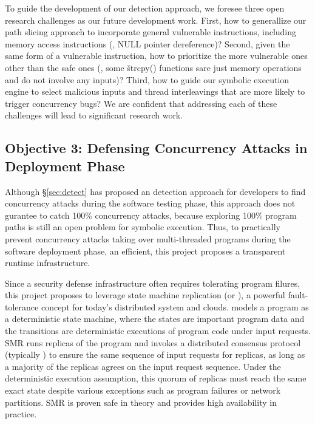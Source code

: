  To guide the development of our detection 
approach, we foresee three open research challenges as our future development 
work. First, how to generallize our path slicing approach to incorporate general 
vulnerable instructions, including memory access instructions (\eg, NULL pointer 
dereference)? Second, given the same form of a vulnerable instruction, how to 
prioritize the more vulnerable ones other than the safe ones (\eg, some 
\v{strcpy()} functions sare just memory operations and do not involve any 
inputs)? Third, how to guide our symbolic execution engine to select malicious 
inputs and thread interleavings that are more likely to trigger concurrency 
bugs? We are confident that addressing each of these challenges will lead to 
significant research work.

\vspace{-.15in}\subsection{Objective 3: Defensing Concurrency Attacks 
in Deployment Phase}\label{sec:defense}\vspace{-.075in}

Although \S\ref{sec:detect} has proposed an detection approach for developers 
to find concurrency attacks during the software testing phase, this approach 
does not gurantee to catch 100\% concurrency attacks, because exploring 100\% 
program paths is still an open problem for symbolic execution. Thus, to 
practically prevent concurrency attacks taking over multi-threaded programs 
during the software deployment phase, an efficient, this project proposes a 
transparent runtime infrastructure.

Since a security defense infrastructure often requires tolerating program 
filures, this project proposes to leverage state machine replication (or \smr), 
a powerful fault-tolerance concept for today's distributed system and clouds. 
\smr models a program as a deterministic state machine, where the states are 
important program data and the transitions are deterministic executions of 
program code under input requests. SMR runs replicas of the program and invokes 
a distributed consensus protocol (typically \paxos) to ensure the same sequence 
of input requests for replicas, as long as a majority of the replicas agrees on 
the input request sequence. Under the deterministic execution assumption, this 
quorum of replicas must reach the same exact state despite various exceptions 
such as program failures or network partitions. SMR is proven safe in theory and 
provides high availability in practice.



